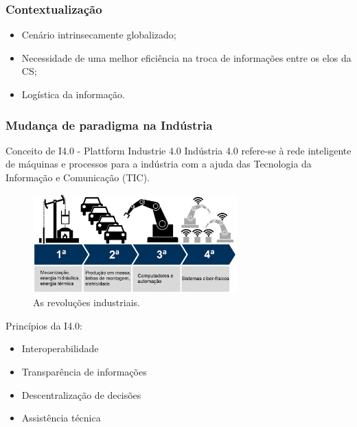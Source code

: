 \documentclass[10pt]{beamer}
\begin{document}
\begin{frame}
	\frametitle{Contextualização}
		
	\begin{itemize}
		\item Cenário intrinsecamente globalizado;
		\item Necessidade de uma melhor eficiência na troca de informações entre os elos da CS;
		\item Logística da informação.
	\end{itemize}

\end{frame}
\begin{frame}
	\frametitle{Mudança de paradigma na Indústria}
	
	\begin{block}{Conceito de I4.0 - Plattform Industrie 4.0 }
		Indústria 4.0 refere-se à rede inteligente de máquinas e processos para a indústria com a ajuda das Tecnologia da Informação e Comunicação (TIC).
	\end{block}
	\noindent
	\begin{minipage}{.7\linewidth}
		\centering
		\begin{figure}[htb]
			\centering
			\caption{As revoluções industriais.}
			\label{fig:i4}
			\includegraphics[width=0.7\textwidth]{i4.png}
		\end{figure}
	\end{minipage}%
	\begin{minipage}{.3\linewidth}
		\centering
		{\scriptsize Princípios da I4.0:
		\begin{itemize}
			\item Interoperabilidade
			\item Transparência de informações
			\item Descentralização de decisões
			\item Assistência técnica
		\end{itemize}}
	\end{minipage}	
	
\end{frame}
\end{document}
